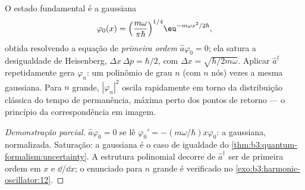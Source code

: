 \begin{proposition}\label{prop:b3:harmonic-oscillator:wavefunctions}
O estado fundamental é a gaussiana
\[
\varphi_0(x) = \Big(\frac{m\omega}{\pi\hbar}\Big)^{1/4}
\eu^{-m\omega x^2/2\hbar} ,
\]
obtida resolvendo a equação de \emph{primeira ordem} $\hat a\varphi_0
= 0$; ela satura a desigualdade de Heisenberg, $\Delta x\,\Delta p =
\hbar/2$, com $\Delta x = \sqrt{\hbar/2m\omega}$. Aplicar
$\hat a^\dagger$ repetidamente gera $\varphi_n$: um polinômio de grau
$n$ (com $n$ nós) vezes a mesma gaussiana. Para $n$ grande,
$|\varphi_n|^2$ oscila rapidamente em torno da distribuição clássica do
tempo de permanência, máxima perto dos pontos de retorno --- o
princípio da correspondência em imagem.
\end{proposition}

\begin{proof}[Demonstração parcial]
$\hat a\varphi_0 = 0$ se lê $\varphi_0' = -(m\omega/\hbar)x
\varphi_0$: a gaussiana, normalizada. Saturação: a gaussiana é o caso
de igualdade do \cref{thm:b3:quantum-formalism:uncertainty}. A
estrutura polinomial decorre de $\hat a^\dagger$ ser de primeira ordem
em $x$ e $\dd/\dd x$; o enunciado para $n$ grande é verificado no
\cref{exo:b3:harmonic-oscillator:12}.
\end{proof}

